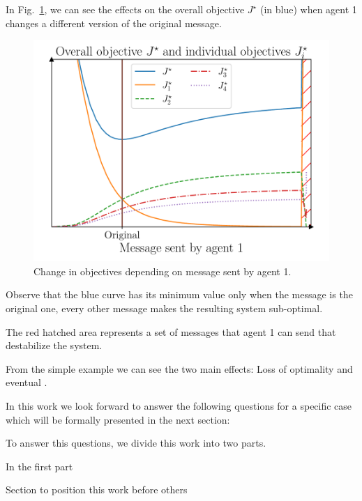 \documentclass[../main.tex]{subfiles}
\begin{document}
\begin{example}
  In Fig.~\ref{fig:change_in_j}, we can see the effects on the overall objective $J^{\star}$ (in blue) when agent 1 changes a different version of the original message.
  \begin{figure}[H]
    \centering
    \includegraphics[width=.55\textwidth]{../img/qualitative_example.pdf}
    \caption{Change in objectives depending on message sent by agent 1.}\label{fig:change_in_j}
  \end{figure}
  Observe that the blue curve has its minimum value only when the message is the original one, every other message makes the resulting system sub-optimal.

  The red hatched area represents a set of messages that agent 1 can send that destabilize the system.
\end{example}

From the simple example we can see the two main effects: Loss of optimality and eventual .

In this work we look forward to answer the following questions for a specific case which will be formally presented in the next section:


To answer this questions, we divide this work into two parts.

In the first part



Section to position this work before others
\end{document}
